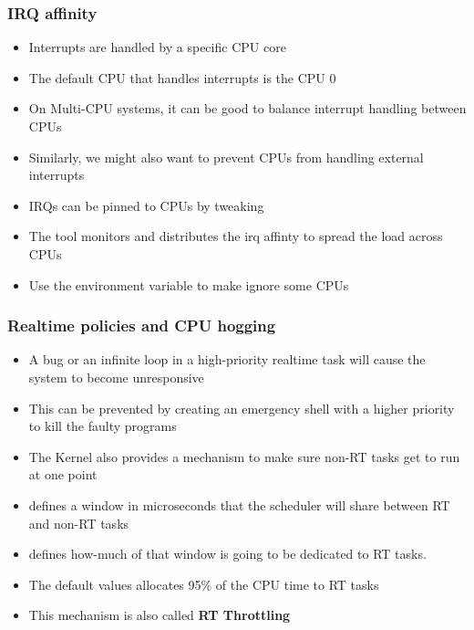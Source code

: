 \begin{frame}
	\frametitle{IRQ affinity}
	\begin{itemize}
		\item Interrupts are handled by a specific CPU core
		\item The default CPU that handles interrupts is the CPU 0
		\item On Multi-CPU systems, it can be good to balance interrupt handling between CPUs
		\item Similarly, we might also want to prevent CPUs from handling external interrupts
		\item IRQs can be pinned to CPUs by tweaking 
		\item The  tool monitors and distributes the irq affinty to spread the load across CPUs
		\item Use the  environment variable to make  ignore some CPUs
	\end{itemize}
\end{frame}



\begin{frame}
	\frametitle{Realtime policies and CPU hogging}
	\begin{itemize}
		\item A bug or an infinite loop in a high-priority realtime task will cause the system to become unresponsive
		\item This can be prevented by creating an emergency shell with a higher priority to kill the faulty programs
		\item The Kernel also provides a mechanism to make sure non-RT tasks get to run at one point
		\item {} defines a window in microseconds that the scheduler will share between RT and non-RT tasks
		\item {} defines how-much of that window is going to be dedicated to RT tasks.
		\item The default values allocates 95\% of the CPU time to RT tasks
		\item This mechanism is also called \textbf{RT Throttling}
	\end{itemize}
\end{frame}

